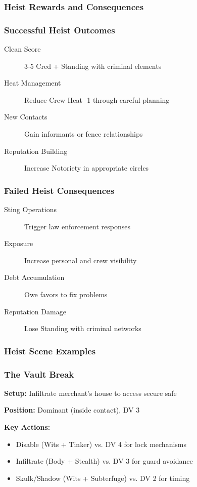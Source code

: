 \documentclass[11pt]{article}
\begin{document}
\subsubsection{Heist Rewards and Consequences}

\subsubsection{Successful Heist Outcomes}

\begin{description}
    \item[Clean Score] 3-5 Cred + Standing with criminal elements
    \item[Heat Management] Reduce Crew Heat -1 through careful planning
    \item[New Contacts] Gain informants or fence relationships
    \item[Reputation Building] Increase Notoriety in appropriate circles
\end{description}

\subsubsection{Failed Heist Consequences}

\begin{description}
    \item[Sting Operations] Trigger law enforcement responses
    \item[Exposure] Increase personal and crew visibility
    \item[Debt Accumulation] Owe favors to fix problems
    \item[Reputation Damage] Lose Standing with criminal networks
\end{description}

\subsubsection{Heist Scene Examples}

\subsubsection{The Vault Break}

\textbf{Setup:} Infiltrate merchant's house to access secure safe

\textbf{Position:} Dominant (inside contact), DV 3

\textbf{Key Actions:}
\begin{itemize}
    \item Disable (Wits + Tinker) vs. DV 4 for lock mechanisms
    \item Infiltrate (Body + Stealth) vs. DV 3 for guard avoidance
    \item Skulk/Shadow (Wits + Subterfuge) vs. DV 2 for timing
\end{itemize}
\end{document}
